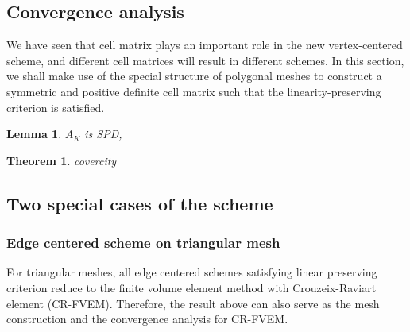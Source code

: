 \documentclass[times,review,preprint,authoryear]{elsarticle}
\newtheorem{theorem}{Theorem}
\newtheorem{lemma}{Lemma}
\begin{document}
\subsection{Convergence analysis}

We have seen that cell matrix plays an important role in the new vertex-centered scheme, and different cell matrices will result in different schemes. In this section, we shall make use of the special structure of polygonal meshes to construct a symmetric and positive definite cell matrix such that the linearity-preserving criterion is satisfied.




\begin{lemma}
$A_K$ is SPD, 
\end{lemma}

\begin{theorem}
covercity
\end{theorem}

\subsection{Two special cases of the scheme}

\subsubsection{Edge centered scheme on triangular mesh}

For triangular meshes, all edge centered schemes satisfying linear preserving criterion reduce to the finite volume element method with Crouzeix-Raviart element (CR-FVEM). Therefore, the result above can also serve as the mesh construction and the convergence analysis for CR-FVEM.
\end{document}
